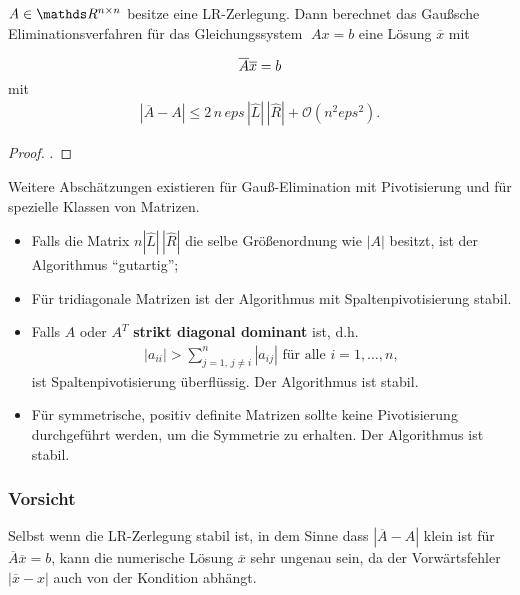 \begin{Satze}[Sautter 1971]
  $ A \in \R^{n\times n}$ besitze eine LR-Zerlegung.  Dann berechnet das
  Gaußsche Eliminationsverfahren für das Gleichungssystem
  $\;  A  x =  b$ eine Lösung $\overline{ x}$ mit 
  \begin{gather*} \overline{ A} \overline{ x}  =   b \vspace*{-2ex} \end{gather*}
  mit
  \begin{gather*} 
    | \overline{ A} - A |  \leq  2 \, n \, eps \,
    |\hat{L}| \, | \hat{R}| + \mathcal{O}( n^2 eps^2).
  \end{gather*}
\end{Satze}

\begin{proof}
  \cite[siehe][]{deuflhardhohmann}.
\end{proof}

Weitere Abschätzungen existieren für Gauß-Elimination mit 
Pivotisierung und für spezielle Klassen von Matrizen.

\label{III.3.13}
\begin{itemize}
\item Falls die Matrix $n | \hat{ L} | \,  |\hat{ R}|$ die
  selbe Größenordnung wie $| A|$ besitzt, ist der
  Algorithmus \enquote{gutartig};
\item Für tridiagonale Matrizen  ist der Algorithmus mit
  Spaltenpivotisierung stabil.
\item Falls $ A$ oder $ A^T$  \textbf{strikt diagonal
    dominant} ist, d.h. 
  \begin{gather*}
    | a_{ii} | > \sum\limits_{j=1 ,\, j \not = i}^{n} | a_{ij}| 
    \mbox{ für alle } i = 1, \ldots, n,
  \end{gather*}
  ist Spaltenpivotisierung überflüssig. Der Algorithmus ist stabil.
\item Für symmetrische, positiv definite Matrizen sollte keine Pivotisierung
  durchgeführt werden, um die Symmetrie zu erhalten.
  Der Algorithmus ist stabil.
\end{itemize}

\subsubsection{Vorsicht}
Selbst wenn die LR-Zerlegung stabil ist, in dem Sinne dass
$| \overline{ A} - A|$ klein ist für
$ \overline{ A}\overline{ x}  =  b $, 
kann die numerische Lösung $\overline{ x}$ sehr
ungenau sein, da der Vorwärtsfehler $| \overline{ x} - {  x}| $ auch von der
Kondition abhängt.


